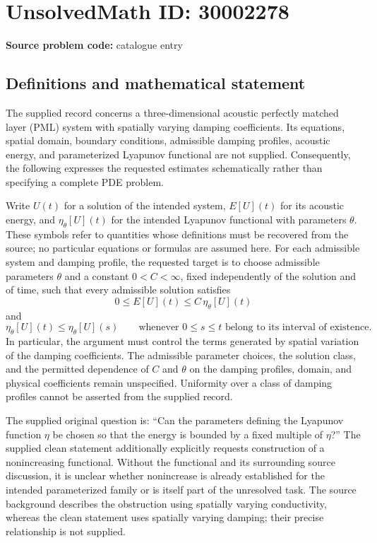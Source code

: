 \documentclass[11pt]{article}
\begin{document}
\section*{UnsolvedMath ID: 30002278}
\textbf{Source problem code:} catalogue entry
\subsection{Definitions and mathematical statement}
The supplied record concerns a three-dimensional acoustic perfectly matched layer (PML) system with spatially varying damping coefficients. Its equations, spatial domain, boundary conditions, admissible damping profiles, acoustic energy, and parameterized Lyapunov functional are not supplied. Consequently, the following expresses the requested estimates schematically rather than specifying a complete PDE problem.

Write \(U(t)\) for a solution of the intended system, \(E[U](t)\) for its acoustic energy, and \(\eta_\theta[U](t)\) for the intended Lyapunov functional with parameters \(\theta\). These symbols refer to quantities whose definitions must be recovered from the source; no particular equations or formulas are assumed here. For each admissible system and damping profile, the requested target is to choose admissible parameters \(\theta\) and a constant \(0<C<\infty\), fixed independently of the solution and of time, such that every admissible solution satisfies
\[
0\le E[U](t)\le C\,\eta_\theta[U](t)
\]
and
\[
\eta_\theta[U](t)\le\eta_\theta[U](s)
\qquad\text{whenever }0\le s\le t
\text{ belong to its interval of existence}.
\]
In particular, the argument must control the terms generated by spatial variation of the damping coefficients. The admissible parameter choices, the solution class, and the permitted dependence of \(C\) and \(\theta\) on the damping profiles, domain, and physical coefficients remain unspecified. Uniformity over a class of damping profiles cannot be asserted from the supplied record.

The supplied original question is: ``Can the parameters defining the Lyapunov function \(\eta\) be chosen so that the energy is bounded by a fixed multiple of \(\eta\)?'' The supplied clean statement additionally explicitly requests construction of a nonincreasing functional. Without the functional and its surrounding source discussion, it is unclear whether nonincrease is already established for the intended parameterized family or is itself part of the unresolved task. The source background describes the obstruction using spatially varying conductivity, whereas the clean statement uses spatially varying damping; their precise relationship is not supplied.
\end{document}
